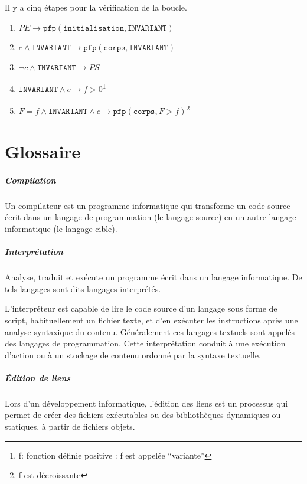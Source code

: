 \documentclass[12pt,a4paper,openany]{book}
\newcommand{\pfp}{\texttt{pfp}}
\begin{document}
Il y a cinq étapes pour la vérification de la boucle.
\begin{enumerate}
	\item $PE \rightarrow \pfp(\texttt{initialisation}, \texttt{INVARIANT})$
	\item $c \wedge \texttt{INVARIANT} \rightarrow \pfp (\texttt{corps}, \texttt{INVARIANT})$\label{etape2boucle}
	\item $\neg c \wedge \texttt{INVARIANT} \rightarrow PS$ \label{etape3boucle}
	\item $ \texttt{INVARIANT} \wedge c \rightarrow f > 0$\footnote{f: fonction définie positive : f est appelée ``variante''}
	\item $F = f \wedge \texttt{INVARIANT} \wedge c \rightarrow \pfp (\texttt{corps}, F > f)$\footnote{f est décroissante}
\end{enumerate}

\appendix
	\chapter{Glossaire}
	\paragraph{Compilation} Un compilateur est un programme informatique qui transforme un code source écrit dans un langage de programmation (le langage source) en un autre langage informatique (le langage cible).
	\paragraph{Interprétation}
	Analyse, traduit et exécute un programme écrit dans un langage informatique. De tels langages sont dits langages interprétés.

	L'interpréteur est capable de lire le code source d'un langage sous forme de script, habituellement un fichier texte, et d'en exécuter les instructions après une analyse syntaxique du contenu. Généralement ces langages textuels sont appelés des langages de programmation. Cette interprétation conduit à une exécution d'action ou à un stockage de contenu ordonné par la syntaxe textuelle.  \paragraph{Édition de liens} Lors d’un développement informatique, l'édition des liens est un processus qui permet de créer des fichiers exécutables ou des bibliothèques dynamiques ou statiques, à partir de fichiers objets.
	
	\lstlistoflistings{}
\end{document}
